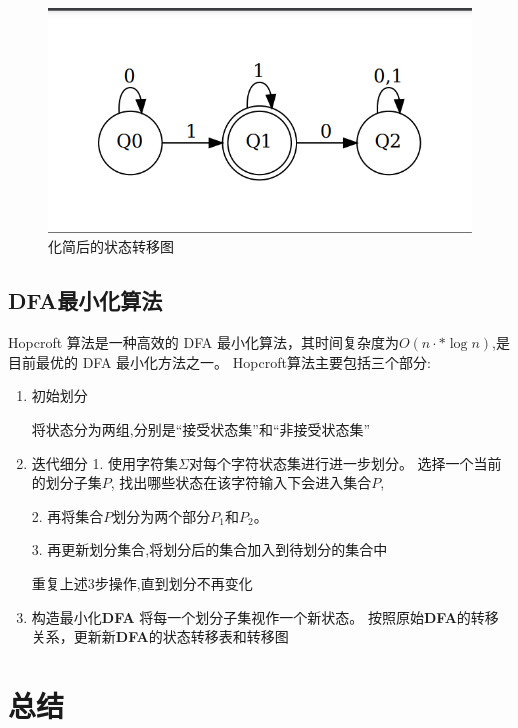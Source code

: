 \documentclass{article}
\begin{document}
\begin{figure}[h]
    \centering
    \includegraphics[scale=0.2]{../Img/minimized_dfa_example.png}
    \caption{化简后的状态转移图}
\end{figure}




\subsection{DFA最小化算法}
Hopcroft 算法是一种高效的 DFA 最小化算法，其时间复杂度为$O(n\cdot *\log n)$,是目前最优的 DFA 最小化方法之一。
Hopcroft算法主要包括三个部分:
\begin{enumerate}
    \item 初始划分
        
    
    将状态分为两组,分别是“接受状态集”和“非接受状态集”

    \item 迭代细分 
        1. 使用字符集$\Sigma$对每个字符状态集进行进一步划分。
        选择一个当前的划分子集$P$, 找出哪些状态在该字符输入下会进入集合$P$,
    
        2. 再将集合$P$划分为两个部分$P_1$和$P_2$。
        
        3. 再更新划分集合,将划分后的集合加入到待划分的集合中

        重复上述3步操作,直到划分不再变化        

    \item 构造最小化\textbf{DFA}
        将每一个划分子集视作一个新状态。
        按照原始\textbf{DFA}的转移关系，更新新\textbf{DFA}的状态转移表和转移图
\end{enumerate}

\newpage
\section{总结}
\end{document}
